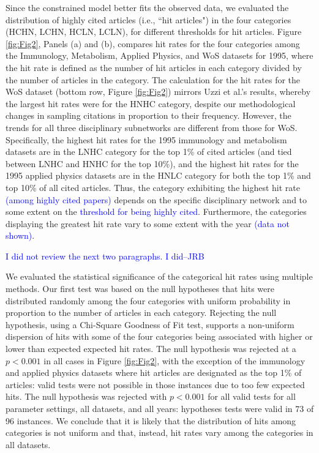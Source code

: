 \documentclass[NETN]{stjour}
\begin{document}
Since the constrained model better fits the observed data, we evaluated the distribution of 
highly cited articles  (i.e., ``hit articles")
 in the four categories (HCHN, LCHN, HCLN, LCLN), for different
thresholds for hit articles.
Figure \ref{fig:Fig2}, Panels (a) and (b), compares hit rates for the four categories among the Immunology, Metabolism, Applied Physics, and WoS datasets for 1995, where the hit rate is defined as the number of hit articles in each category divided by the number of articles in the category. 
The calculation for the hit rates for the WoS dataset (bottom row, Figure \ref{fig:Fig2})
mirrors Uzzi et al.'s results, whereby the largest hit rates were for the HNHC category, despite our methodological changes in sampling citations in proportion to their frequency. 
However, the trends  for all three  disciplinary subnetworks  are different from those for WoS.
Specifically, the highest hit rates for the 1995 immunology and metabolism datasets are in the LNHC category for the top 1\% of cited articles (and tied between LNHC and HNHC for the top 10\%),
and the highest hit rates for the 1995 applied physics datasets are in the 
HNLC category for both the top 1\% and top 10\% of all cited articles.  
 Thus, the category exhibiting the highest hit rate \textcolor{blue}{(among highly cited papers)} depends on the
specific disciplinary network and to some extent on the \textcolor{blue}{threshold for being highly cited}.
Furthermore, the categories displaying the greatest hit rate vary 
to some extent %
with the year  \textcolor{blue}{(data not shown)}.


\textcolor{blue}{I did not review the next two paragraphs.  I did--JRB}

We evaluated the statistical significance of the categorical hit rates using multiple methods.  Our first test was based on the null hypotheses that hits were distributed randomly among the four categories with uniform probability in proportion to the number of articles in each category. Rejecting the null hypothesis, using a Chi-Square Goodness of Fit test, supports a non-uniform dispersion of hits with some of the four categories being associated with higher or lower than expected expected hit rates. The null hypothesis was rejected at a $p<0.001$ in all cases in  Figure \ref{fig:Fig2}, with the exception of the immunology and applied physics datasets where hit articles are designated as the top 1\% of articles: valid tests were not possible in those instances due to too few expected hits. The null hypothesis was rejected with $p<0.001$ for all valid tests for all parameter settings, all datasets, and all years: hypotheses tests were valid in 73 of 96 instances. We conclude that it is likely that the distribution of hits among categories is not uniform and that, instead, hit rates vary among the categories in all datasets. 
\end{document}
